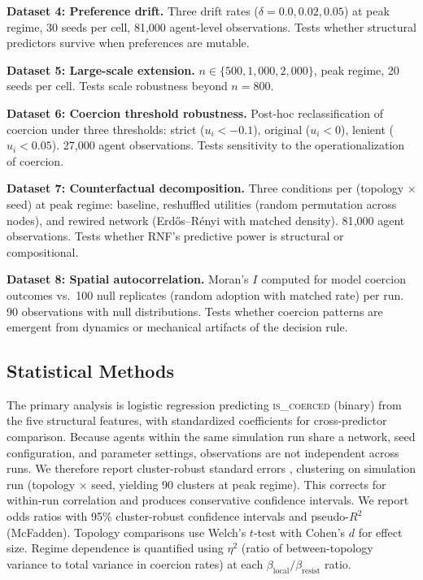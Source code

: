 \documentclass[11pt, a4paper]{article}
\newcommand{\betalocal}{\beta_{\text{local}}}
\newcommand{\betaresist}{\beta_{\text{resist}}}
\begin{document}
\textbf{Dataset 4: Preference drift.} Three drift rates ($\delta = 0.0, 0.02, 0.05$) at peak regime, 30 seeds per cell, 81{,}000 agent-level observations. Tests whether structural predictors survive when preferences are mutable.

\textbf{Dataset 5: Large-scale extension.} $n \in \{500, 1{,}000, 2{,}000\}$, peak regime, 20 seeds per cell. Tests scale robustness beyond $n = 800$.

\textbf{Dataset 6: Coercion threshold robustness.} Post-hoc reclassification of coercion under three thresholds: strict ($u_i < -0.1$), original ($u_i < 0$), lenient ($u_i < 0.05$). 27{,}000 agent observations. Tests sensitivity to the operationalization of coercion.

\textbf{Dataset 7: Counterfactual decomposition.} Three conditions per (topology $\times$ seed) at peak regime: baseline, reshuffled utilities (random permutation across nodes), and rewired network (Erd\H{o}s--R\'{e}nyi with matched density). 81{,}000 agent observations. Tests whether RNF's predictive power is structural or compositional.

\textbf{Dataset 8: Spatial autocorrelation.} Moran's $I$ computed for model coercion outcomes vs.\ 100 null replicates (random adoption with matched rate) per run. 90 observations with null distributions. Tests whether coercion patterns are emergent from dynamics or mechanical artifacts of the decision rule.

\subsection{Statistical Methods}

The primary analysis is logistic regression predicting \textsc{is\_coerced} (binary) from the five structural features, with standardized coefficients for cross-predictor comparison. Because agents within the same simulation run share a network, seed configuration, and parameter settings, observations are not independent across runs. We therefore report cluster-robust standard errors \citep{cameron2008bootstrap}, clustering on simulation run (topology $\times$ seed, yielding 90 clusters at peak regime). This corrects for within-run correlation and produces conservative confidence intervals. We report odds ratios with 95\% cluster-robust confidence intervals and pseudo-$R^2$ (McFadden). Topology comparisons use Welch's $t$-test with Cohen's $d$ for effect size. Regime dependence is quantified using $\eta^2$ (ratio of between-topology variance to total variance in coercion rates) at each $\betalocal/\betaresist$ ratio.
\end{document}
